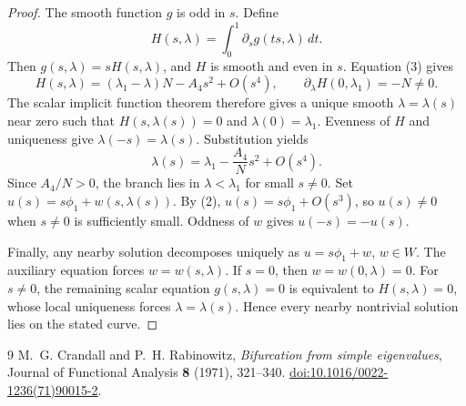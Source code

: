 \documentclass[11pt]{article}
\begin{document}
\begin{proof}
The smooth function \(g\) is odd in \(s\). Define
\[
 H(s,\lambda)=\int_0^1\partial_sg(ts,\lambda)\,dt.
\]
Then \(g(s,\lambda)=sH(s,\lambda)\), and \(H\) is smooth and even
in \(s\). Equation (3) gives
\[
 H(s,\lambda)=(\lambda_1-\lambda)N-A_4s^2+O(s^4),
 \qquad
 \partial_\lambda H(0,\lambda_1)=-N\ne0.
\]
The scalar implicit function theorem therefore gives a unique smooth
\(\lambda=\lambda(s)\) near zero such that
\(H(s,\lambda(s))=0\) and \(\lambda(0)=\lambda_1\).
Evenness of \(H\) and uniqueness give
\(\lambda(-s)=\lambda(s)\). Substitution yields
\[
 \lambda(s)=\lambda_1-\frac{A_4}{N}s^2+O(s^4).
\]
Since \(A_4/N>0\), the branch lies in \(\lambda<\lambda_1\)
for small \(s\ne0\). Set
\(u(s)=s\phi_1+w(s,\lambda(s))\).
By (2), \(u(s)=s\phi_1+O(s^3)\), so \(u(s)\ne0\) when
\(s\ne0\) is sufficiently small.
Oddness of \(w\) gives \(u(-s)=-u(s)\).

Finally, any nearby solution decomposes uniquely as
\(u=s\phi_1+w\), \(w\in W\). The auxiliary equation forces
\(w=w(s,\lambda)\). If \(s=0\), then \(w=w(0,\lambda)=0\).
For \(s\ne0\), the remaining scalar equation \(g(s,\lambda)=0\)
is equivalent to \(H(s,\lambda)=0\), whose local uniqueness
forces \(\lambda=\lambda(s)\). Hence every nearby nontrivial
solution lies on the stated curve.
\end{proof}

\begin{thebibliography}{9}
M.~G. Crandall and P.~H. Rabinowitz,
\emph{Bifurcation from simple eigenvalues},
Journal of Functional Analysis \textbf{8} (1971), 321--340.
\href{https://doi.org/10.1016/0022-1236(71)90015-2}{doi:10.1016/0022-1236(71)90015-2}.
\end{thebibliography}
\end{document}
